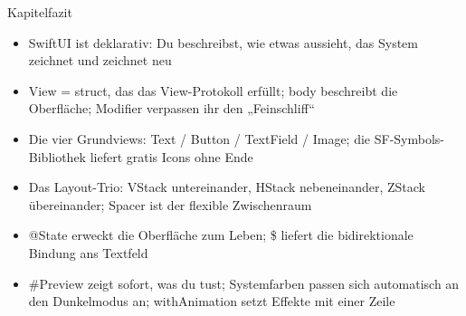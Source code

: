 \begin{tcbsummary}{Kapitelfazit}
\begin{itemize}
  \item SwiftUI ist deklarativ: Du beschreibst, wie etwas aussieht, das System zeichnet und zeichnet neu
  \item View = struct, das das View-Protokoll erfüllt; body beschreibt die Oberfläche; Modifier verpassen ihr den „Feinschliff“
  \item Die vier Grundviews: Text / Button / TextField / Image; die SF-Symbols-Bibliothek liefert gratis Icons ohne Ende
  \item Das Layout-Trio: VStack untereinander, HStack nebeneinander, ZStack übereinander; Spacer ist der flexible Zwischenraum
  \item @State erweckt die Oberfläche zum Leben; \$ liefert die bidirektionale Bindung ans Textfeld
  \item \#Preview zeigt sofort, was du tust; Systemfarben passen sich automatisch an den Dunkelmodus an; withAnimation setzt Effekte mit einer Zeile
\end{itemize}

\end{tcbsummary}
